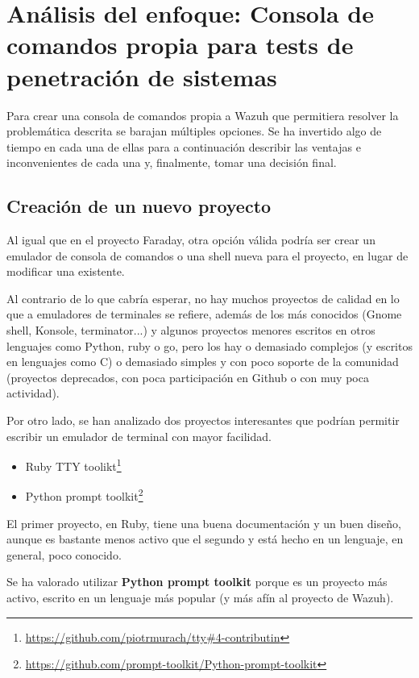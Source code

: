 \section{Análisis del enfoque: Consola de comandos propia para tests de penetración de sistemas}

Para crear una consola de comandos propia a Wazuh que permitiera resolver la problemática descrita se barajan múltiples opciones. Se ha invertido algo de tiempo en cada una de ellas para a continuación describir las ventajas e inconvenientes de cada una y, finalmente, tomar una decisión final.


\subsection{Creación de un nuevo proyecto}

Al igual que en el proyecto Faraday, otra opción válida podría ser crear un emulador de consola de comandos o una shell nueva para el proyecto, en lugar de modificar una existente.

Al contrario de lo que cabría esperar, no hay muchos proyectos de calidad en lo que a emuladores de terminales se refiere, además de los más conocidos (Gnome shell, Konsole, terminator...) y algunos proyectos menores escritos en otros lenguajes como Python, ruby o go, pero los hay o demasiado complejos (y escritos en lenguajes como C) o demasiado simples y con poco soporte de la comunidad (proyectos deprecados, con poca participación en Github o con muy poca actividad). 

Por otro lado, se han analizado dos proyectos interesantes que podrían permitir escribir un emulador de terminal con mayor facilidad.

\begin{itemize}
    \item Ruby TTY toolikt\footnote{\url{https://github.com/piotrmurach/tty#4-contributin}}
    \item Python prompt toolkit\footnote{\url{https://github.com/prompt-toolkit/Python-prompt-toolkit}}
\end{itemize}

El primer proyecto, en Ruby, tiene una buena documentación y un buen diseño, aunque es bastante menos activo que el segundo y está hecho en un lenguaje, en general, poco conocido. 

Se ha valorado utilizar \textbf{Python prompt toolkit} porque es un proyecto más activo, escrito en un lenguaje más popular (y más afín al proyecto de Wazuh).

